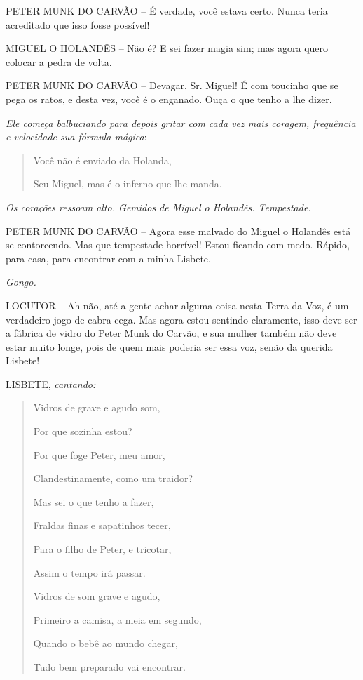 PETER MUNK DO CARVÃO -- É verdade, você estava certo. Nunca teria
acreditado que isso fosse possível!

MIGUEL O HOLANDÊS -- Não é? E sei fazer magia sim; mas agora quero
colocar a pedra de volta.

PETER MUNK DO CARVÃO -- Devagar, Sr. Miguel! É com toucinho que se pega
os ratos, e desta vez, você é o enganado. Ouça o que tenho a lhe dizer.

\emph{Ele começa balbuciando para depois gritar com cada vez mais
coragem, frequência e velocidade sua fórmula mágica}:

\begin{quote}
Você não é enviado da Holanda,

Seu Miguel, mas é o inferno que lhe manda.
\end{quote}

\emph{Os corações ressoam alto. Gemidos de Miguel o Holandês.
Tempestade.}

PETER MUNK DO CARVÃO -- Agora esse malvado do Miguel o Holandês está se
contorcendo. Mas que tempestade horrível! Estou ficando com medo.
Rápido, para casa, para encontrar com a minha Lisbete.

\emph{Gongo.}

LOCUTOR -- Ah não, até a gente achar alguma coisa nesta Terra da Voz, é
um verdadeiro jogo de cabra-cega. Mas agora estou sentindo claramente,
isso deve ser a fábrica de vidro do Peter Munk do Carvão, e sua mulher
também não deve estar muito longe, pois de quem mais poderia ser essa
voz, senão da querida Lisbete!

LISBETE, \emph{cantando:}

\begin{quote}
Vidros de grave e agudo som,

Por que sozinha estou?

Por que foge Peter, meu amor,

Clandestinamente, como um traidor?

Mas sei o que tenho a fazer,

Fraldas finas e sapatinhos tecer,

Para o filho de Peter, e tricotar,

Assim o tempo irá passar.

Vidros de som grave e agudo,

Primeiro a camisa, a meia em segundo,

Quando o bebê ao mundo chegar,

Tudo bem preparado vai encontrar.
\end{quote}

